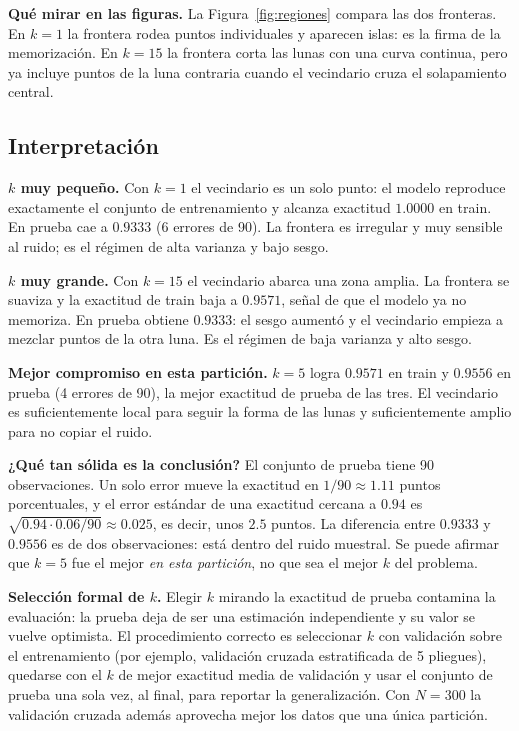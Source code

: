 \documentclass[12pt,a4paper]{article}
\begin{document}
\begin{cajaVar}
  \textbf{Qué mirar en las figuras.} La Figura~\ref{fig:regiones} compara las
  dos fronteras. En $k=1$ la frontera rodea puntos
  individuales y aparecen islas: es la firma de la memorización. En $k=15$ la
  frontera corta las lunas con una curva continua, pero ya incluye puntos de la
  luna contraria cuando el vecindario cruza el solapamiento central.
\end{cajaVar}

\subsection{Interpretación}

\textbf{$k$ muy pequeño.} Con $k=1$ el vecindario es un solo punto: el modelo
reproduce exactamente el conjunto de entrenamiento y alcanza exactitud
$1.0000$ en train. En prueba cae a $0.9333$ (6 errores de 90). La frontera es
irregular y muy sensible al ruido; es el régimen de alta varianza y bajo sesgo.

\textbf{$k$ muy grande.} Con $k=15$ el vecindario abarca una zona amplia. La
frontera se suaviza y la exactitud de train baja a $0.9571$, señal de que el
modelo ya no memoriza. En prueba obtiene $0.9333$: el sesgo aumentó y el
vecindario empieza a mezclar puntos de la otra luna. Es el régimen de baja
varianza y alto sesgo.

\textbf{Mejor compromiso en esta partición.} $k=5$ logra $0.9571$ en train y
$0.9556$ en prueba (4 errores de 90), la mejor exactitud de prueba de las tres.
El vecindario es suficientemente local para seguir la forma de las lunas y
suficientemente amplio para no copiar el ruido.

\textbf{¿Qué tan sólida es la conclusión?} El conjunto de prueba tiene 90
observaciones. Un solo error mueve la exactitud en $1/90\approx1.11$ puntos
porcentuales, y el error estándar de una exactitud cercana a $0.94$ es
$\sqrt{0.94\cdot0.06/90}\approx0.025$, es decir, unos $2.5$ puntos. La
diferencia entre $0.9333$ y $0.9556$ es de dos observaciones: está dentro del
ruido muestral. Se puede afirmar que $k=5$ fue el mejor \emph{en esta
partición}, no que sea el mejor $k$ del problema.

\textbf{Selección formal de $k$.} Elegir $k$ mirando la exactitud de prueba
contamina la evaluación: la prueba deja de ser una estimación independiente y
su valor se vuelve optimista. El procedimiento correcto es seleccionar $k$ con
validación sobre el entrenamiento (por ejemplo, validación cruzada
estratificada de 5 pliegues), quedarse con el $k$ de mejor exactitud media de
validación y usar el conjunto de prueba una sola vez, al final, para reportar
la generalización. Con $N=300$ la validación cruzada además aprovecha mejor los
datos que una única partición.
\end{document}
